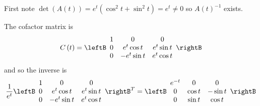 \begin{solution} First note $\det \left( A\left( t\right) \right) =
e^{t}(\cos^2 t + \sin^2 t) = e^{t}\neq 0$ so $A\left( t\right) ^{-1}$
exists.

The cofactor matrix is
\begin{equation*}
C\left( t\right) =\leftB
\begin{array}{ccc}
1 & 0 & 0 \\
0 & e^{t}\cos t & e^{t}\sin t \\
0 & -e^{t}\sin t & e^{t}\cos t
\end{array}
\rightB
\end{equation*}
and so the inverse is
\begin{equation*}
\vspace{0.05in}\frac{1}{e^{t}}\leftB
\begin{array}{ccc}
1 & 0 & 0 \\
0 & e^{t}\cos t & e^{t}\sin t \\
0 & -e^{t}\sin t & e^{t}\cos t
\end{array}
\rightB ^{T}= \leftB
\begin{array}{ccc}
e^{-t} & 0 & 0 \\
0 & \cos t & -\sin t \\
0 & \sin t & \cos t
\end{array}
\rightB 
\end{equation*}

\end{solution}